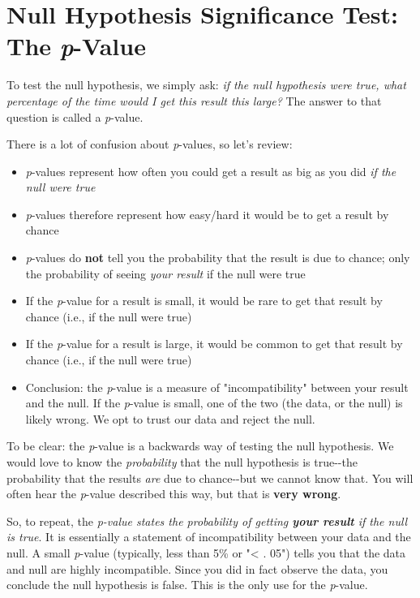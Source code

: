 \documentclass[11pt]{article}
\providecommand{\tightlist}{%
      \setlength{\itemsep}{0pt}\setlength{\parskip}{0pt}}
\begin{document}
\section{\texorpdfstring{Null Hypothesis Significance Test: The
\emph{p}-Value}{Null Hypothesis Significance Test: The p-Value}}\label{null-hypothesis-significance-test-the-p-value}

To test the null hypothesis, we simply ask: \emph{if the null hypothesis
were true, what percentage of the time would I get this result this
large?} The answer to that question is called a \emph{p}-value.

There is a lot of confusion about \emph{p}-values, so let's review:

\begin{itemize}
\tightlist
\item
  \emph{p}-values represent how often you could get a result as big as
  you did \emph{if the null were true}
\item
  \emph{p}-values therefore represent how easy/hard it would be to get a
  result by chance
\item
  \emph{p}-values do \textbf{not} tell you the probability that the
  result is due to chance; only the probability of seeing \emph{your
  result} if the null were true
\item
  If the \emph{p}-value for a result is small, it would be rare to get
  that result by chance (i.e., if the null were true)
\item
  If the \emph{p}-value for a result is large, it would be common to get
  that result by chance (i.e., if the null were true)
\item
  Conclusion: the \emph{p}-value is a measure of "incompatibility"
  between your result and the null. If the \emph{p}-value is small, one
  of the two (the data, or the null) is likely wrong. We opt to trust
  our data and reject the null.
\end{itemize}

To be clear: the \emph{p}-value is a backwards way of testing the null
hypothesis. We would love to know the \emph{probability} that the null
hypothesis is true-\/-the probability that the results \emph{are} due to
chance-\/-but we cannot know that. You will often hear the
\emph{p}-value described this way, but that is \textbf{very wrong}.

So, to repeat, the \emph{p-value states the probability of getting
\textbf{your result} if the null is true}. It is essentially a statement
of incompatibility between your data and the null. A small
\emph{p}-value (typically, less than 5\% or "\textless{} . 05") tells
you that the data and null are highly incompatible. Since you did in
fact observe the data, you conclude the null hypothesis is false. This
is the only use for the \emph{p}-value.
\end{document}
